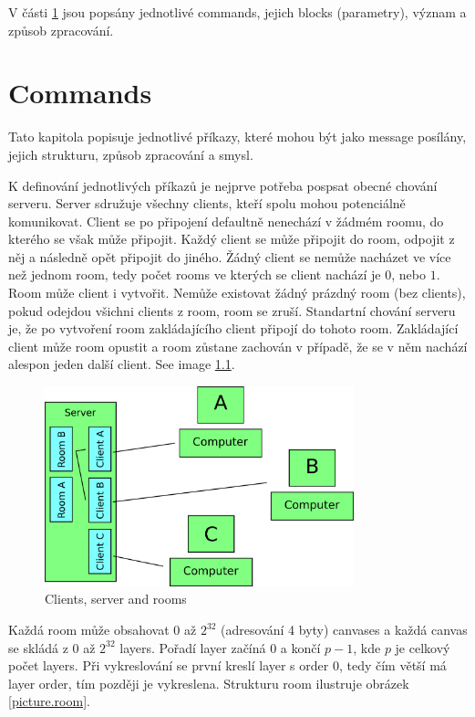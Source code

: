 \documentclass[12pt,oneside,a4paper]{report}
\begin{document}
V části \ref{text.commands} jsou popsány jednotlivé commands, jejich blocks (parametry), význam a způsob zpracování.

\chapter{Commands}
\label{text.commands}

Tato kapitola popisuje jednotlivé příkazy, které mohou být jako message posílány, jejich strukturu, způsob zpracování a smysl.

K definování jednotlivých příkazů je nejprve potřeba pospsat obecné chování serveru. Server sdružuje všechny clients, kteří spolu mohou potenciálně komunikovat. Client se po připojení defaultně nenechází v žádmém roomu, do kterého se však může připojit. Každý client se může připojit do room, odpojit z něj a následně opět připojit do jiného. Žádný client se nemůže nacházet ve více než jednom room, tedy počet rooms ve kterých se client nachází je $0$, nebo $1$. Room může client i vytvořit. Nemůže existovat žádný prázdný room (bez clients), pokud odejdou všichni clients z room, room se zruší. Standartní chování serveru je, že po vytvoření room zakládajícího client připojí do tohoto room. Zakládající client může room opustit a room zůstane zachován v případě, že se v něm nachází alespon jeden další client. See image \ref{picture.server_client_rooms}.

\begin{figure}[h]
  \centering
  \includegraphics[width=0.80\textwidth]{diagrams/server_client_rooms.png}
  \caption{Clients, server and rooms}
  \label{picture.server_client_rooms}
\end{figure}

Každá room může obsahovat $0$ až $2^{32}$ (adresování 4 byty) canvases a každá canvas se skládá z $0$ až $2^{32}$ layers. Pořadí layer začíná $0$ a končí $p - 1$, kde $p$ je celkový počet layers. Při vykreslování se první kreslí layer s order $0$, tedy čím větší má layer order, tím později je vykreslena. Strukturu room ilustruje obrázek \ref{picture.room}.
\end{document}
